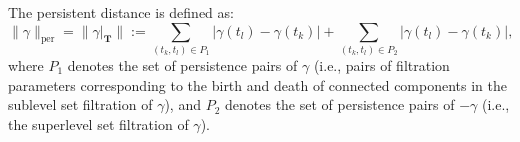 \documentclass{ws-mplb}
\begin{document}
%









The persistent distance is defined as:
\begin{equation}
\lVert \gamma \rVert_{\text{per}} = \lVert \gamma|_{\mathbf{T}} \rVert:= \sum_{(t_k, t_l) \in P_1} \vert \gamma(t_l) - \gamma(t_k) \vert + \sum_{(t_k, t_l) \in P_2} \vert \gamma(t_l) - \gamma(t_k) \vert,
\end{equation}
where \( P_1 \) denotes the set of persistence pairs of \( \gamma \) (i.e., pairs of filtration parameters corresponding to the birth and death of connected components in the sublevel set filtration of \( \gamma \)), and \( P_2 \) denotes the set of persistence pairs of \( -\gamma \) (i.e., the superlevel set filtration of \( \gamma \)). 

\end{document}
